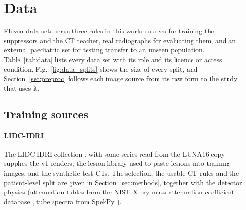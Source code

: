 \section{Data}
\label{sec:data}
Eleven data sets serve three roles in this work: sources for training the suppressors and the CT teacher, real radiographs for evaluating
them, and an external paediatric set for testing transfer to an unseen population. Table~\ref{tab:data} lists every data set with its role
and its licence or access condition, Fig.~\ref{fig:data_splits} shows the size of every split, and Section~\ref{sec:preproc} follows each
image source from its raw form to the study that uses it.

\subsection{Training sources}
\paragraph{LIDC-IDRI} The LIDC-IDRI collection \citep{armato2011lidc,armato2015lidctcia,clark2013tcia}, with some series read from the LUNA16 copy
\citep{setio2017luna16}, supplies the v1 renders, the lesion library used to paste lesions into training images, and the synthetic test CTs. The
selection, the usable-CT rules and the patient-level split are given in Section~\ref{sec:methods}, together with the detector physics (attenuation
tables from the NIST X-ray mass attenuation coefficient database \citep{hubbell2004xraymass}, tube spectra from SpekPy \citep{poludniowski2021spekpy}).

